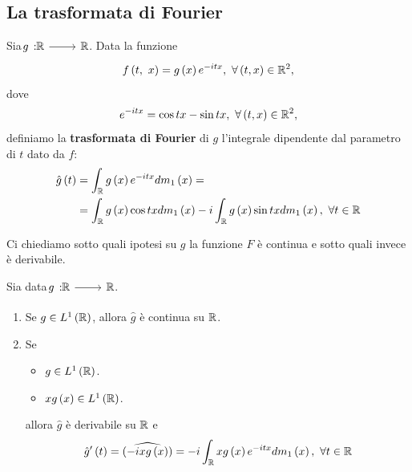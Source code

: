 \subsection{La trasformata di Fourier}
\begin{define}
	Sia $\funz{g}{\realset}{\realset}$. Data la funzione
	\begin{equation*}
		f\left(t,\ x\right)=g\left(x\right)e^{-itx},\ \forall \left(t,x\right)\in\mathbb{R}^2,
	\end{equation*}
	dove
	\begin{equation*}
		e^{-itx}=\cos tx-\sin tx,\ \forall\left(t,x\right)\in\realset^2,
	\end{equation*}
	definiamo la \textbf{trasformata di Fourier} di $g$ l'integrale dipendente dal parametro di $t$ dato da $f$:
	\begin{align}
		\hat{g}\left(t\right)&=\int_{\mathbb{R}}g\left(x\right)e^{-itx}dm_1\left(x\right)=\\
		&=\int_{\mathbb{R}}g\left(x\right)\cos txdm_1\left(x\right)-i\int_{\mathbb{R}} g\left(x\right)\sin txdm_1\left(x\right),\ \forall t\in\mathbb{R}
	\end{align}
\end{define}
Ci chiediamo sotto quali ipotesi su $g$ la funzione $F$ è continua e sotto quali invece è derivabile.
\begin{theorema}
	Sia data $\funz{g}{\realset}{\realset}$.
	\begin{enumerate}
		\item Se $g\in L^1\left(\mathbb{R}\right)$, allora $\hat{g}$ è continua su $\mathbb{R}$.
		\item Se
		\begin{itemize}
			\item $g\in L^1\left(\mathbb{R}\right)$.
			\item $xg\left(x\right)\in L^1\left(\mathbb{R}\right)$.
		\end{itemize}
	allora $\hat{g}$ è derivabile su $\mathbb{R}$ e
	\begin{equation}
		\hat{g}'\left(t\right)=\widehat{\left(-ixg\left(x\right)\right)}=-i\int_{\realset}xg\left(x\right)e^{-itx}dm_1\left(x\right),\ \forall t\in\realset
	\end{equation}
	\end{enumerate}
\end{theorema}
